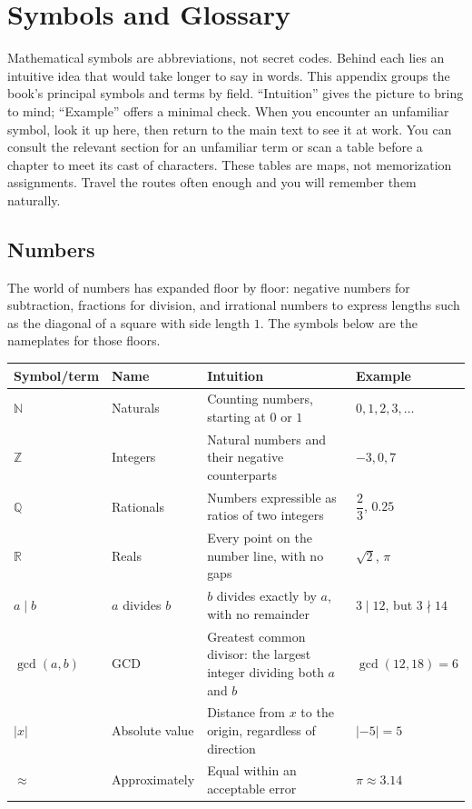 \chapter{Symbols and Glossary}

Mathematical symbols are abbreviations, not secret codes. Behind each lies an intuitive idea that would take longer to say in words. This appendix groups the book's principal symbols and terms by field. ``Intuition'' gives the picture to bring to mind; ``Example'' offers a minimal check. When you encounter an unfamiliar symbol, look it up here, then return to the main text to see it at work. You can consult the relevant section for an unfamiliar term or scan a table before a chapter to meet its cast of characters. These tables are maps, not memorization assignments. Travel the routes often enough and you will remember them naturally.

\section{Numbers}

The world of numbers has expanded floor by floor: negative numbers for subtraction, fractions for division, and irrational numbers to express lengths such as the diagonal of a square with side length $1$. The symbols below are the nameplates for those floors.

\begin{center}
\begin{tabular}{llp{4.6cm}p{4.6cm}}
\toprule
Symbol/term & Name & Intuition & Example \\
\midrule
$\mathbb{N}$ & Naturals & Counting numbers, starting at $0$ or $1$ & $0,1,2,3,\dots$ \\
$\mathbb{Z}$ & Integers & Natural numbers and their negative counterparts & $-3,0,7$ \\
$\mathbb{Q}$ & Rationals & Numbers expressible as ratios of two integers & $\dfrac{2}{3}$, $0.25$ \\
$\mathbb{R}$ & Reals & Every point on the number line, with no gaps & $\sqrt{2}$, $\pi$ \\
$a\mid b$ & $a$ divides $b$ & $b$ divides exactly by $a$, with no remainder & $3\mid 12$, but $3\nmid 14$ \\
$\gcd(a,b)$ & GCD & Greatest common divisor: the largest integer dividing both $a$ and $b$ & $\gcd(12,18)=6$ \\
$|x|$ & Absolute value & Distance from $x$ to the origin, regardless of direction & $|-5|=5$ \\
$\approx$ & Approximately & Equal within an acceptable error & $\pi\approx 3.14$ \\
\bottomrule
\end{tabular}
\end{center}

